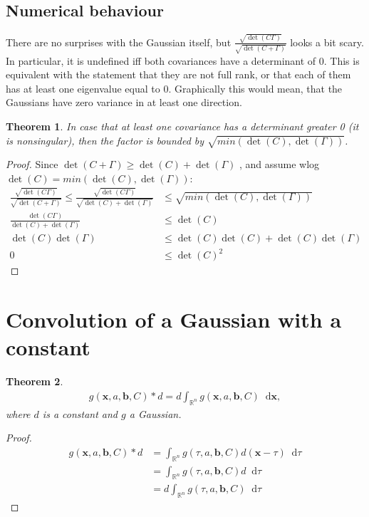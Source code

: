\documentclass{paper}
\newtheorem{theorem}{Theorem}
\newcommand{\vr}[1]{\ensuremath{\boldsymbol{#1}}}
\newcommand{\f}[1]{#1}
\newcommand*\diff{\mathop{}\!\mathrm{d}}
\newcommand{\bvec}[0]{\ensuremath{\vr{b}}}
\newcommand{\xvec}[0]{\ensuremath{\vr{x}}}
\begin{document}
\subsection{Numerical behaviour}
There are no surprises with the Gaussian itself, but $\frac{\sqrt{\det(C\Gamma)}}{\sqrt{\det(C+\Gamma)}}$ looks a bit scary.
In particular, it is undefined iff both covariances have a determinant of 0.
This is equivalent with the statement that they are not full rank, or that each of them has at least one eigenvalue equal to 0.
Graphically this would mean, that the Gaussians have zero variance in at least one direction.

\begin{theorem}
	In case that at least one covariance has a determinant greater 0 (it is nonsingular), then the factor is bounded by $\sqrt{\f{min}(\det(C), \det(\Gamma))}$.
\end{theorem}
\begin{proof}
Since $\det(C+\Gamma) \ge \det(C) + \det(\Gamma)$ \cite{wiki_det_inequalities}, and assume wlog $\det(C) = \f{min}(\det(C), \det(\Gamma))$:
\begin{align*}
	\frac{\sqrt{\det(C\Gamma)}}{\sqrt{\det(C+\Gamma)}} \le \frac{\sqrt{\det(C\Gamma)}}{\sqrt{\det(C) + \det(\Gamma)}} &\le \sqrt{\f{min}(\det(C), \det(\Gamma))} \\
	\frac{\det(C\Gamma)}{\det(C) + \det(\Gamma)} &\le \det(C) \\
	\det(C)\det(\Gamma) &\le \det(C)\det(C) + \det(C)\det(\Gamma) \\
	0 &\le \det(C)^2
\end{align*}
\end{proof}

\section{Convolution of a Gaussian with a constant}
\begin{theorem}
	\begin{align}
		g(\xvec, a, \bvec, C) \ast d = d \int_{\mathbb{R}^n} g(\xvec, a, \bvec, C) \diff \xvec,
	\end{align}
	where $d$ is a constant and $g$ a Gaussian. 
\end{theorem}
\begin{proof}
	\begin{align}
		g(\xvec, a, \bvec, C) \ast d &= \int_{\mathbb{R}^n} g(\tau, a, \bvec, C) d(\xvec - \tau) \diff \tau\\
		&= \int_{\mathbb{R}^n} g(\tau, a, \bvec, C) d \diff \tau\\
		&= d \int_{\mathbb{R}^n} g(\tau, a, \bvec, C) \diff \tau
	\end{align}
\end{proof}
\end{document}
